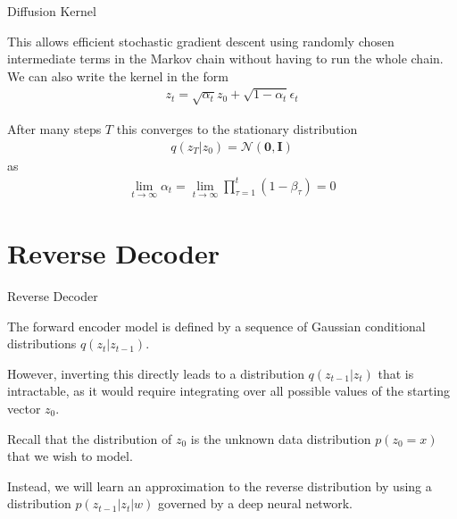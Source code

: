 \documentclass[aspectratio=169,xcolor=dvipsnames]{beamer}
\theoremstyle{named}
\begin{document}

\begin{frame}{Diffusion Kernel}

This allows efficient stochastic gradient descent using randomly chosen intermediate terms in the Markov chain without having to run the whole chain. We can also write the kernel in the form
\begin{align*}
    z_t = \sqrt{\alpha_t} z_0 + \sqrt{1 - \alpha_t} \epsilon_t
\end{align*}

After many steps $T$ this converges to the stationary distribution
\begin{align*}
    q(z_T | z_0) = \mathcal{N}(\mathbf{0}, \mathbf{I})
\end{align*}
as
\begin{align*}
    \lim_{t \to \infty} \alpha_t = \lim_{t \to \infty} \prod^{t}_{\tau=1}(1-\beta_\tau) = 0
\end{align*}

\end{frame}

\section{Reverse Decoder}

\begin{frame}{Reverse Decoder}

The forward encoder model is defined by a sequence of Gaussian
conditional distributions $q(z_t|z_{t-1})$.

\vspace{0.3cm}

However, inverting this directly leads to \alert{a distribution $q(z_{t-1}|z_t)$ that is intractable}, as it would require integrating over all possible values of the starting vector $z_0$.

\vspace{0.3cm}

Recall that the distribution of $z_0$ is the unknown data distribution $p(z_0 = x)$ that we wish to model. 

\vspace{0.3cm}

Instead, we will learn an approximation to the reverse distribution by \alert{using a distribution $p(z_{t-1}|z_t | w)$ governed by a deep neural network}.

\end{frame}
\end{document}
